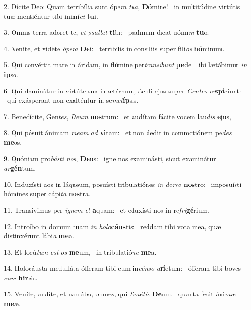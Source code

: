 2. Dícite Deo: Quam terribília sunt ópe\textit{ra} \textit{tu}\textit{a}, \textbf{Dó}mine! \ast\  in multitúdine virtútis tuæ mentiéntur tibi inimí\textit{ci} \textbf{tu}i.\

3. Omnis terra adóret te, \textit{et} \textit{psal}\textit{lat} \textbf{ti}bi: \ast\  psalmum dicat nómi\textit{ni} \textbf{tu}o.\

4. Veníte, et vidéte \textit{ó}\textit{pe}\textit{ra} \textbf{De}i: \ast\  terríbilis in consíliis super fíli\textit{os} \textbf{hó}minum.\

5. Qui convértit mare in áridam, in flúmine per\textit{trans}\textit{í}\textit{bunt} \textbf{pe}de: \ast\  ibi lætábimur \textit{in} \textbf{ip}so.\

6. Qui dominátur in virtúte sua in ætérnum, óculi ejus super \textit{Gen}\textit{tes} \textit{re}\textbf{spí}ciunt: \ast\  qui exásperant non exalténtur in se\textit{met}\textbf{íp}sis.\

7. Benedícite, Gen\textit{tes}, \textit{De}\textit{um} \textbf{nos}trum: \ast\  et audítam fácite vocem lau\textit{dis} \textbf{e}jus,\

8. Qui pósuit ánimam \textit{me}\textit{am} \textit{ad} \textbf{vi}tam: \ast\  et non dedit in commotiónem pe\textit{des} \textbf{me}os.\

9. Quóniam pro\textit{bás}\textit{ti} \textit{nos}, \textbf{De}us: \ast\  igne nos examinásti, sicut examinátur \textit{ar}\textbf{gén}tum.\

10. Induxísti nos in láqueum, posuísti tribulatiónes \textit{in} \textit{dor}\textit{so} \textbf{nos}tro: \ast\  imposuísti hómines super cápi\textit{ta} \textbf{nos}tra.\

11. Transívimus per \textit{i}\textit{gnem} \textit{et} \textbf{a}quam: \ast\  et eduxísti nos in re\textit{fri}\textbf{gé}rium.\

12. Introíbo in domum tuam \textit{in} \textit{ho}\textit{lo}\textbf{cáus}tis: \ast\  reddam tibi vota mea, quæ distinxérunt lábi\textit{a} \textbf{me}a.\

13. Et locú\textit{tum} \textit{est} \textit{os} \textbf{me}um, \ast\  in tribulatió\textit{ne} \textbf{me}a.\

14. Holocáusta medulláta ófferam tibi cum in\textit{cén}\textit{so} \textit{a}\textbf{rí}etum: \ast\  ófferam tibi boves \textit{cum} \textbf{hir}cis.\

15. Veníte, audíte, et narrábo, omnes, qui \textit{ti}\textit{mé}\textit{tis} \textbf{De}um: \ast\  quanta fecit áni\textit{mæ} \textbf{me}æ.\

